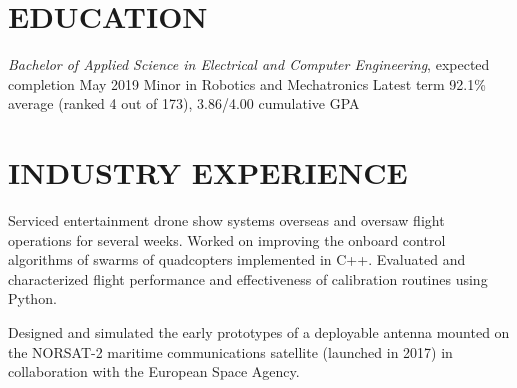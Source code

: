 \documentclass{ResumeTemplate}
\begin{document}
	
	
	
	\section{EDUCATION}
	\workitemsthree
	{{\textit{Bachelor of Applied Science in Electrical and Computer Engineering}, expected completion May 2019}}
	{Minor in Robotics and Mechatronics}
	{Latest term 92.1\% average (ranked 4 out of 173), 3.86/4.00 cumulative GPA}
	
	\section{INDUSTRY EXPERIENCE}
	

	\workitemsthree
	{Serviced entertainment drone show systems overseas and oversaw flight operations for several weeks.}
	{Worked on improving the onboard control algorithms of swarms of quadcopters implemented in C++.}
	{Evaluated and characterized flight performance and effectiveness of calibration routines using Python.}
	

	\workitemsone
	{Designed and simulated the early prototypes of a deployable antenna mounted on the NORSAT-2 maritime communications satellite (launched in 2017) in collaboration with the European Space Agency.}
	
\end{document}
